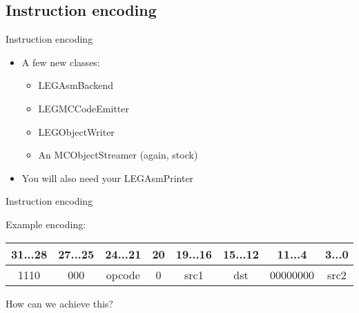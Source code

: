 
\subsection{Instruction encoding}

\begin{frame}{Instruction encoding}

\begin{itemize}
    \item A few new classes:
    \begin{itemize}
        \item LEGAsmBackend
        \item LEGMCCodeEmitter
        \item LEGObjectWriter
        \item An MCObjectStreamer (again, stock)
    \end{itemize}
    \item You will also need your LEGAsmPrinter
\end{itemize}

\end{frame}


\begin{frame}[fragile]{Instruction encoding}

Example encoding:

\vspace{1ex}

\begin{tabular}{|c|c|c|c|c|c|c|c|}
\hline 
31...28 & 27...25 & 24...21 & 20 & 19...16 & 15...12 & 11...4 & 3...0\tabularnewline
\hline 
1110 & 000 & opcode & 0 & src1 & dst & 00000000 & src2\tabularnewline
\hline 
\end{tabular}

\vspace{2ex}

How can we achieve this?

\vspace{1ex}


\end{frame}

